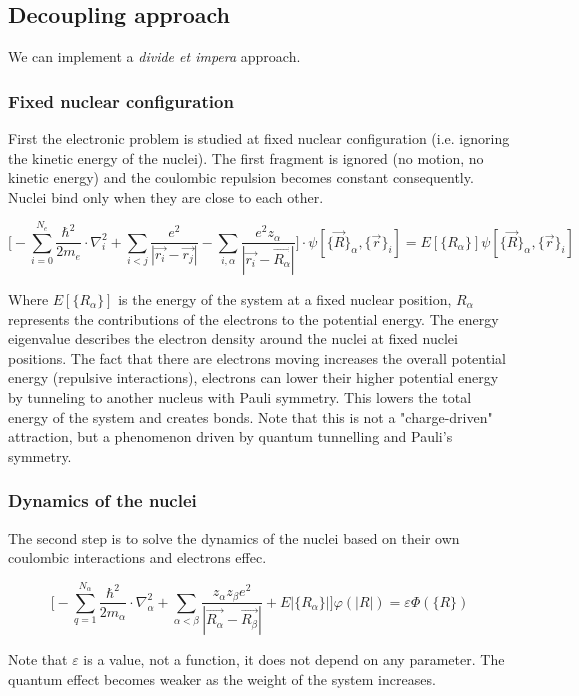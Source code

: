 	\subsection{Decoupling approach}
	We can implement a \textit{divide et impera} approach.

		\subsubsection{Fixed nuclear configuration}
		First the electronic problem is studied at fixed nuclear configuration (i.e. ignoring the kinetic energy of the nuclei).
		The first fragment is ignored (no motion, no kinetic energy) and the coulombic repulsion becomes constant consequently.
		Nuclei bind only when they are close to each other.

		$$\bigg[-\sum_{i=0}^{N_e}\frac{\hbar^2}{2m_e}\cdot\nabla^2_i+\sum_{i<j}\frac{e^2}{|\vec{r_i}-\vec{r_j}|}-\sum_{i,\alpha}\frac{e^2z_{\alpha}}{|\vec{r_i}-\vec{R_{\alpha}}|}\bigg]\cdot\psi[\{\vec{R}\}_{\alpha},\{\vec{r}\}_i] =E[\{R_{\alpha}\}]\psi[\{\vec{R}\}_{\alpha},\{\vec{r}\}_i]$$

		Where $E[\{R_{\alpha}\}]$ is the energy of the system at a fixed nuclear position, ${R_{\alpha}}$ represents the contributions of the electrons to the potential energy.
		The energy eigenvalue describes the electron density around the nuclei at fixed nuclei positions.
		The fact that there are electrons moving increases the overall potential energy (repulsive interactions), electrons can lower their higher potential energy by tunneling to another nucleus with Pauli symmetry.
		This lowers the total energy of the system and creates bonds.
		Note that this is not a "charge-driven" attraction, but a phenomenon driven by quantum tunnelling and Pauli's symmetry.

		\subsubsection{Dynamics of the nuclei}
		The second step is to solve the dynamics of the nuclei based on their own coulombic interactions and electrons effec.

		$$\bigg[-\sum_{q=1}^{N_{\alpha}}\frac{\hbar^2}{2m_{\alpha}}\cdot\nabla_{\alpha}^2+\sum_{\alpha<\beta}\frac{z_{\alpha}z_{\beta}e^2}{|\vec{R_{\alpha}}-\vec{R_{\beta}}|}+E|\{R_\alpha\}| \bigg]\varphi(|R|)=\varepsilon\varPhi(\{R\})$$

		Note that $\varepsilon$ is a value, not a function, it does not depend on any parameter.
		The quantum effect becomes weaker as the weight of the system increases.

